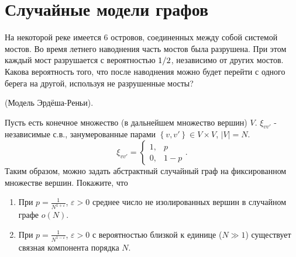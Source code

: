 \section{Случайные модели графов}

\begin{problem}

На некоторой реке имеется 6 островов, соединенных между собой системой мостов. Во время летнего наводнения часть мостов была разрушена. При этом каждый мост разрушается с вероятностью ${1\mathord{\left/ {\vphantom {1 2}} \right. \kern-\nulldelimiterspace} 2} $, независимо от других мостов. Какова вероятность того, что после наводнения можно будет перейти с одного берега на другой, используя не разрушенные мосты?


\end{problem}

\begin{problem}

(Модель Эрдёша-Реньи).

 Пусть есть конечное множество (в дальнейшем множество вершин) $V$. $\xi _{vv'} $ - независимые с.в., занумерованные парами $\left\{v,v'\right\}\in V\times V$, $\vert V \vert = N$.
\[\xi _{vv'} =\left\{\begin{array}{cc} {1,} & {p} \\ {0,} & {1-p} \end{array}\right. .\] 
Таким образом, можно задать абстрактный случайный граф на фиксированном множестве вершин. Покажите, что 

\begin{enumerate}
\item  При $p=\frac{1}{N^{1+\varepsilon } } $, $\varepsilon >0$ среднее число не изолированных вершин в случайном графе $o\left(N\right)$.

\item  При $p=\frac{1}{N^{1-\varepsilon } } $, $\varepsilon >0$ с вероятностью близкой к единице ($N \gg 1$) существует связная компонента порядка $N$.
\end{enumerate}



\end{problem}

